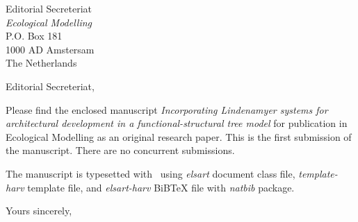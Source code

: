 \documentclass{letter}
\begin{document}
\begin{letter}{Editorial Secreteriat \\ \textsl{Ecological Modelling} \\ 
               P.O. Box 181 \\ 1000 AD Amstersam \\ The Netherlands} 
\opening{Editorial Secreteriat,}

Please find the  enclosed manuscript \textsl{Incorporating Lindenamyer
systems     for      \mbox{architectural}     development     in     a
functional-structural  tree  model}   for  publication  in  Ecological
Modelling  as   an  original  research  paper.   This   is  the  first
\mbox{submission}   of  the  manuscript.   There  are   no  concurrent
submissions.

The  manuscript  is  typesetted  with \LaTeXe\  using  \textsl{elsart}
document  class   file,  \textsl{template-harv}  template   file,  and
\textsl{elsart-harv} BiBTeX file with \textsl{natbib} package.

\closing{Yours sincerely,}
\end{letter}
\end{document}
